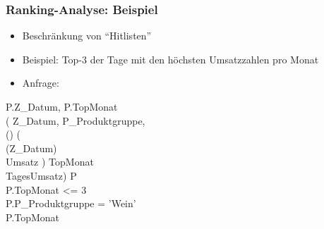     
    \begin{frame}
    
    \frametitle{Ranking-Analyse: Beispiel}
    
    \begin{itemize}
    \item Beschränkung von "`Hitlisten"'
    \item Beispiel: Top-3 der Tage mit den höchsten Umsatzzahlen pro Monat
    \item Anfrage:
    \end{itemize}
      \begin{sql}
          P.Z\_Datum, P.TopMonat\\
          ( Z\_Datum, P\_Produktgruppe,\\
    \2 () (\\
    \3 (Z\_Datum)\\
        \3  Umsatz )  TopMonat\\
        \2  TagesUmsatz)  P\\
         P.TopMonat <= 3 \\
    \1 P.P\_Produktgruppe = 'Wein' \\
         P.TopMonat 
      \end{sql}
    
    \end{frame}
    
    
